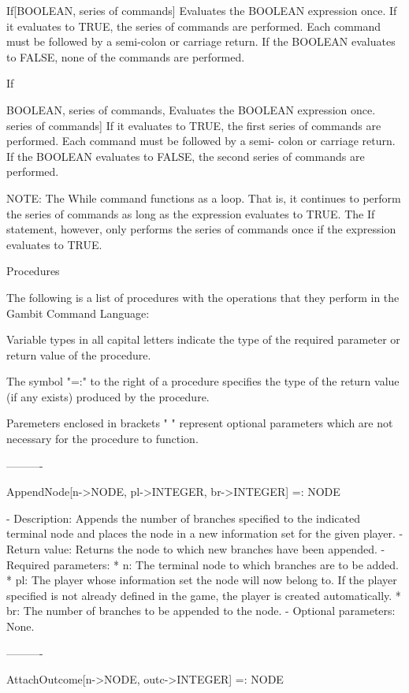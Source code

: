 If[BOOLEAN, {series of commands}]	Evaluates the BOOLEAN expression once.
					If it evaluates to TRUE, the series of
					commands are performed.  Each command
					must be followed by a semi-colon or
					carriage return.  If the BOOLEAN 
					evaluates to FALSE, none of the 
					commands are performed.

If{BOOLEAN, {series of commands},	Evaluates the BOOLEAN expression once.
{series of commands}]			If it evaluates to TRUE, the first 
					series of commands are performed.  Each
					command must be followed by a semi-
					colon or carriage return.  If the 
					BOOLEAN evaluates to FALSE, the second
					series of commands are performed.
	

	NOTE:	The While command functions as a loop.  That is, it continues
		to perform the series of commands as long as the expression
		evaluates to TRUE.  The If statement, however, only performs
		the series of commands once if the expression evaluates to
		TRUE.


Procedures

The following is a list of procedures with the operations that they perform
in the Gambit Command Language:

Variable types in all capital letters indicate the type of the required
parameter or return value of the procedure.

The symbol "=:" to the right of a procedure specifies the type of the return
value (if any exists) produced by the procedure.

Paremeters enclosed in brackets "{ }" represent optional parameters which
are not necessary for the procedure to function.

----------

AppendNode[n->NODE, pl->INTEGER, br->INTEGER] =: NODE

   -	Description:  Appends the number of branches specified to the indicated
	terminal node and places the node in a new information set for the
	given player.
   -	Return value:  Returns the node to which new branches have been 
	appended.
   -	Required parameters:
	  *  n:  The terminal node to which branches are to be added.
	  *  pl:  The player whose information set the node will now belong to.
		If the player specified is not already defined in the game, the
		player is created automatically. 
	  *  br:  The number of branches to be appended to the node.
   -	Optional parameters:  None.

----------

AttachOutcome[n->NODE, outc->INTEGER] =: NODE

}
